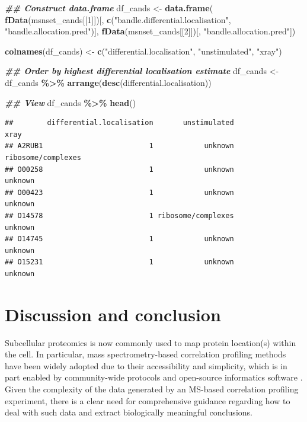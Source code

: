 \documentclass[9pt,a4paper,]{extarticle}
\newenvironment{Shaded}{\begin{snugshade}}{\end{snugshade}}
\newcommand{\DecValTok}[1]{\textcolor[rgb]{0.00,0.00,0.81}{#1}}
\newcommand{\DocumentationTok}[1]{\textcolor[rgb]{0.56,0.35,0.01}{\textbf{\textit{#1}}}}
\newcommand{\FunctionTok}[1]{\textcolor[rgb]{0.13,0.29,0.53}{\textbf{#1}}}
\newcommand{\NormalTok}[1]{#1}
\newcommand{\OtherTok}[1]{\textcolor[rgb]{0.56,0.35,0.01}{#1}}
\newcommand{\SpecialCharTok}[1]{\textcolor[rgb]{0.81,0.36,0.00}{\textbf{#1}}}
\newcommand{\StringTok}[1]{\textcolor[rgb]{0.31,0.60,0.02}{#1}}
\begin{document}
\begin{Shaded}
\begin{Highlighting}[]
\DocumentationTok{\#\# Construct data.frame}
\NormalTok{df\_cands }\OtherTok{\textless{}{-}} \FunctionTok{data.frame}\NormalTok{(}
    \FunctionTok{fData}\NormalTok{(msnset\_cands[[}\DecValTok{1}\NormalTok{]])[, }\FunctionTok{c}\NormalTok{(}\StringTok{"bandle.differential.localisation"}\NormalTok{, }
                                 \StringTok{"bandle.allocation.pred"}\NormalTok{)],}
    \FunctionTok{fData}\NormalTok{(msnset\_cands[[}\DecValTok{2}\NormalTok{]])[, }\StringTok{"bandle.allocation.pred"}\NormalTok{])}

\FunctionTok{colnames}\NormalTok{(df\_cands) }\OtherTok{\textless{}{-}} \FunctionTok{c}\NormalTok{(}\StringTok{"differential.localisation"}\NormalTok{,}
                        \StringTok{"unstimulated"}\NormalTok{, }\StringTok{"xray"}\NormalTok{)}

\DocumentationTok{\#\# Order by highest differential localisation estimate}
\NormalTok{df\_cands }\OtherTok{\textless{}{-}}\NormalTok{ df\_cands }\SpecialCharTok{\%\textgreater{}\%} 
  \FunctionTok{arrange}\NormalTok{(}\FunctionTok{desc}\NormalTok{(differential.localisation))}

\DocumentationTok{\#\# View}
\NormalTok{df\_cands }\SpecialCharTok{\%\textgreater{}\%} 
  \FunctionTok{head}\NormalTok{()}
\end{Highlighting}
\end{Shaded}

\begin{verbatim}
##        differential.localisation       unstimulated               xray
## A2RUB1                         1            unknown ribosome/complexes
## O00258                         1            unknown            unknown
## O00423                         1            unknown            unknown
## O14578                         1 ribosome/complexes            unknown
## O14745                         1            unknown            unknown
## O15231                         1            unknown            unknown
\end{verbatim}

\section{Discussion and conclusion}\label{discussion-and-conclusion}

Subcellular proteomics is now commonly used to map protein location(s) within the
cell. In particular, mass spectrometry-based correlation profiling methods have
been widely adopted due to their accessibility and simplicity, which is in part
enabled by community-wide protocols and open-source informatics software \citep{Breckels2024}.
Given the complexity of the data generated by an MS-based correlation profiling
experiment, there is a clear need for comprehensive guidance regarding how to
deal with such data and extract biologically meaningful conclusions.
\end{document}
